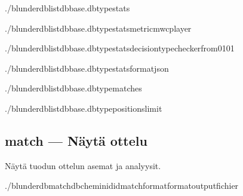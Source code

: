 \documentclass[letterpaper,10pt,finnish]{sphinxmanual}
\begin{document}
\begin{sphinxVerbatim}[commandchars=\\\{\}]
./blunderdblist\PYGZhy{}\PYGZhy{}dbbase.db\PYGZhy{}\PYGZhy{}typestats

./blunderdblist\PYGZhy{}\PYGZhy{}dbbase.db\PYGZhy{}\PYGZhy{}typestats\PYGZhy{}\PYGZhy{}metricmwc\PYGZhy{}\PYGZhy{}player

./blunderdblist\PYGZhy{}\PYGZhy{}dbbase.db\PYGZhy{}\PYGZhy{}typestats\PYGZhy{}\PYGZhy{}decision\PYGZhy{}typechecker\PYGZhy{}\PYGZhy{}from\PYGZhy{}01\PYGZhy{}01

./blunderdblist\PYGZhy{}\PYGZhy{}dbbase.db\PYGZhy{}\PYGZhy{}typestats\PYGZhy{}\PYGZhy{}formatjson

./blunderdblist\PYGZhy{}\PYGZhy{}dbbase.db\PYGZhy{}\PYGZhy{}typematches

./blunderdblist\PYGZhy{}\PYGZhy{}dbbase.db\PYGZhy{}\PYGZhy{}typepositions\PYGZhy{}\PYGZhy{}limit
\end{sphinxVerbatim}


\subsection{match — Näytä ottelu}
\label{\detokenize{cli:match-afficher-un-match}}
\sphinxAtStartPar
Näytä tuodun ottelun asemat ja analyysit.

\begin{sphinxVerbatim}[commandchars=\\\{\}]
./blunderdbmatch\PYGZhy{}\PYGZhy{}db\PYGZlt{}chemin\PYGZgt{}\PYGZhy{}\PYGZhy{}id\PYGZlt{}id\PYGZus{}match\PYGZgt{}\PYG{o}{[}\PYGZhy{}\PYGZhy{}format\PYGZlt{}format\PYGZgt{}\PYG{o}{]}\PYG{o}{[}\PYGZhy{}\PYGZhy{}output\PYGZlt{}fichier\PYGZgt{}\PYG{o}{]}
\end{sphinxVerbatim}
\end{document}
